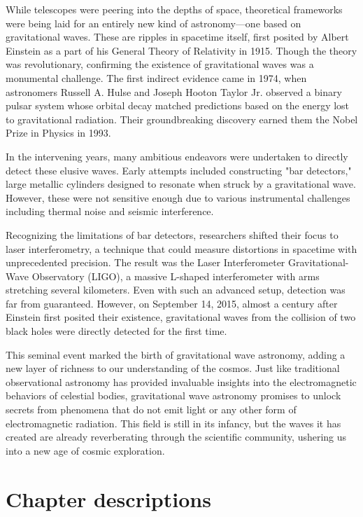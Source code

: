 While telescopes were peering into the depths of space, theoretical frameworks were being laid for an entirely new kind of astronomy—one based on gravitational waves. These are ripples in spacetime itself, first posited by Albert Einstein as a part of his General Theory of Relativity in 1915. Though the theory was revolutionary, confirming the existence of gravitational waves was a monumental challenge. The first indirect evidence came in 1974, when astronomers Russell A. Hulse and Joseph Hooton Taylor Jr. observed a binary pulsar system whose orbital decay matched predictions based on the energy lost to gravitational radiation. Their groundbreaking discovery earned them the Nobel Prize in Physics in 1993.

In the intervening years, many ambitious endeavors were undertaken to directly detect these elusive waves. Early attempts included constructing "bar detectors," large metallic cylinders designed to resonate when struck by a gravitational wave. However, these were not sensitive enough due to various instrumental challenges including thermal noise and seismic interference.

Recognizing the limitations of bar detectors, researchers shifted their focus to laser interferometry, a technique that could measure distortions in spacetime with unprecedented precision. The result was the Laser Interferometer Gravitational-Wave Observatory (LIGO), a massive L-shaped interferometer with arms stretching several kilometers. Even with such an advanced setup, detection was far from guaranteed. However, on September 14, 2015, almost a century after Einstein first posited their existence, gravitational waves from the collision of two black holes were directly detected for the first time.

This seminal event marked the birth of gravitational wave astronomy, adding a new layer of richness to our understanding of the cosmos. Just like traditional observational astronomy has provided invaluable insights into the electromagnetic behaviors of celestial bodies, gravitational wave astronomy promises to unlock secrets from phenomena that do not emit light or any other form of electromagnetic radiation. This field is still in its infancy, but the waves it has created are already reverberating through the scientific community, ushering us into a new age of cosmic exploration.

\section{Chapter descriptions}